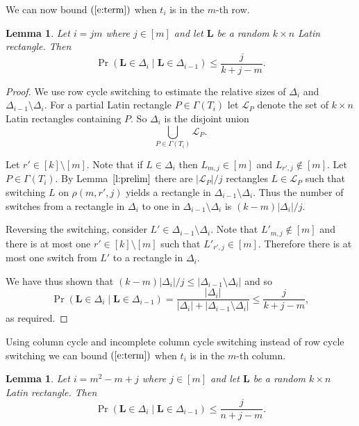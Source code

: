 \documentclass[12pt]{article}
\newtheorem{lem}[thm]{Lemma}
\theoremstyle{definition}
\numberwithin{equation}{section}
\def\eref#1{$(\ref{#1})$}
\def\lref#1{Lemma~$\ref{#1}$}
\renewcommand{\leq}{\leqslant}
\renewcommand{\L}{\mathbf{L}}
\begin{document}
	
	We can now bound \eref{e:term} when $t_i$ is in the $m$-th row.
	
	\begin{lem}\label{l:setrowcycs}
		Let $i=jm$ where $j\in[m]$ and let $\L$ be a random $k \times n$
		Latin rectangle. Then
		\[
		\Pr(\L \in \Delta_i \mid  \L \in \Delta_{i-1}) \leq \frac{j}{k+j-m}.
		\]
	\end{lem}
	
	\begin{proof}
		We use row cycle switching to estimate the relative sizes of $\Delta_i$ and $\Delta_{i-1} \setminus \Delta_i$. For a partial Latin rectangle $P \in \Gamma(T_i)$ let $\mathcal{L}_P$ denote the set of $k \times n$ Latin rectangles containing $P$. So $\Delta_i$ is the disjoint union 
		\[
		\bigcup_{P \in \Gamma(T_i)} \mathcal{L}_P.
		\]
		
		Let $r' \in [k]\setminus [m]$. Note that if $L \in \Delta_i$ then $L_{m, j} \in [m]$ and $L_{r', j} \notin [m]$. Let $P \in \Gamma(T_i)$. By \lref{l:prelim} there are $|\mathcal{L}_P|/j$ rectangles $L \in \mathcal{L}_P$ such that switching $L$ on $\rho(m, r', j)$ yields a rectangle in $\Delta_{i-1} \setminus \Delta_i$. Thus the number of switches from a rectangle in $\Delta_i$ to one in $\Delta_{i-1} \setminus \Delta_i$ is $(k-m)|\Delta_i|/j$.
		
		Reversing the switching, consider $L' \in \Delta_{i-1} \setminus \Delta_i$. Note that $L'_{m, j} \notin [m]$ and there is at most one $r' \in [k]\setminus [m]$ such that $L'_{r', j} \in [m]$. Therefore there is at most one switch from $L'$ to a rectangle in $\Delta_i$.
		
		We have thus shown that $(k-m)|\Delta_i|/j \leq |\Delta_{i-1} \setminus \Delta_i|$ and so
		\[
		\Pr(\L \in \Delta_i \mid  \L \in \Delta_{i-1}) = \frac{|\Delta_i|}{|\Delta_i|+|\Delta_{i-1} \setminus \Delta_i|} \leq \frac j{k+j-m},
		\]
		as required.	
	\end{proof}
	
	Using column cycle and incomplete column cycle switching instead of
	row cycle switching we can bound \eref{e:term} when $t_i$ is in the
	$m$-th column.
	
	\begin{lem}\label{l:setcolcycs}
		Let $i=m^2-m+j$ where $j\in[m]$
		and let $\L$ be a random $k \times n$ Latin rectangle. Then
		\[
		\Pr(\L \in \Delta_i \mid  \L \in \Delta_{i-1}) \leq \frac j{n+j-m}.
		\]
	\end{lem}
	
\end{document}

